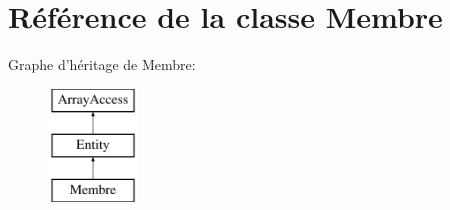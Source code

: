 \hypertarget{class_library_1_1_entities_1_1_membre}{\section{Référence de la classe Membre}
\label{class_library_1_1_entities_1_1_membre}
}
Graphe d'héritage de Membre\+:\begin{figure}[H]
\begin{center}
\leavevmode
\includegraphics[height=3.000000cm]{class_library_1_1_entities_1_1_membre}
\end{center}
\end{figure}
